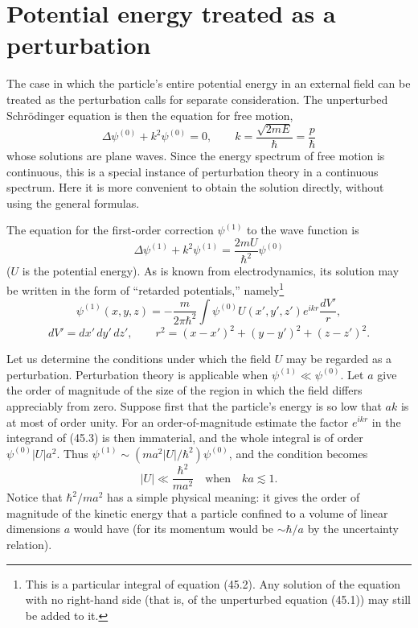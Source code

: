 \section{Potential energy treated as a perturbation}

The case in which the particle's entire potential energy in an external field
can be treated as the perturbation calls for separate consideration. The
unperturbed Schrödinger equation is then the equation for free motion,
\begin{equation}
  \Delta\psi^{(0)}+k^2\psi^{(0)}=0,
  \qquad
  k=\frac{\sqrt{2mE}}{\hbar}=\frac p\hbar
  \tag{45.1}
\end{equation}
whose solutions are plane waves. Since the energy spectrum of free motion is
continuous, this is a special instance of perturbation theory in a continuous
spectrum. Here it is more convenient to obtain the solution directly, without
using the general formulas.

The equation for the first-order correction $\psi^{(1)}$ to the wave function
is
\begin{equation}
  \Delta\psi^{(1)}+k^2\psi^{(1)}=\frac{2mU}{\hbar^2}\psi^{(0)}
  \tag{45.2}
\end{equation}
($U$ is the potential energy). As is known from electrodynamics, its solution
may be written in the form of ``retarded potentials,'' namely\footnote{This is
a particular integral of equation (45.2). Any solution of the equation with
no right-hand side (that is, of the unperturbed equation (45.1)) may still be
added to it.}
\begin{equation}
  \psi^{(1)}(x,y,z)=-\frac{m}{2\pi\hbar^2}
  \int\psi^{(0)}U(x',y',z')e^{ikr}\frac{dV'}r,
  \tag{45.3}
\end{equation}
\[
  dV'=dx'\,dy'\,dz',
  \qquad
  r^2=(x-x')^2+(y-y')^2+(z-z')^2.
\]

Let us determine the conditions under which the field $U$ may be regarded as
a perturbation. Perturbation theory is applicable when
$\psi^{(1)}\ll\psi^{(0)}$. Let $a$ give the order of magnitude of the size of
the region in which the field differs appreciably from zero. Suppose first
that the particle's energy is so low that $ak$ is at most of order unity. For
an order-of-magnitude estimate the factor $e^{ikr}$ in the integrand of
(45.3) is then immaterial, and the whole integral is of order
$\psi^{(0)}|U|a^2$. Thus
$\psi^{(1)}\sim(ma^2|U|/\hbar^2)\psi^{(0)}$, and the condition becomes
\begin{equation}
  |U|\ll\frac{\hbar^2}{ma^2}
  \quad\text{when}\quad ka\lesssim1.
  \tag{45.4}
\end{equation}
Notice that $\hbar^2/ma^2$ has a simple physical meaning: it gives the order
of magnitude of the kinetic energy that a particle confined to a volume of
linear dimensions $a$ would have (for its momentum would be
$\sim\hbar/a$ by the uncertainty relation).

